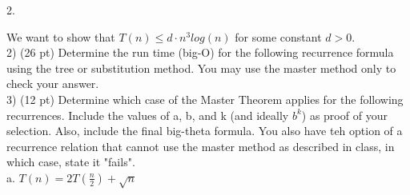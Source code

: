 \documentclass[8pt, a4paper]{article}
\begin{document}
2. 

We want to show that $ T(n) \leq d \cdot n^3 log(n) $ for some constant $ d > 0 $. \\ 


2) (26 pt) Determine the run time (big-O) for the following recurrence formula using the tree or substitution method.
You may use the master method only to check your answer. \\


3) (12 pt) Determine which case of the Master Theorem applies for the following recurrences. Include the values of
a, b, and k (and ideally $b^k$) as proof of your selection. Also, include the final big-theta formula. 
You also have teh option of a recurrence relation that cannot use the master method as described in class, 
in which case, state it "fails". \\

  a. $ T(n) = 2T (\frac{n}{2}) + \sqrt{n} $
\end{document}
